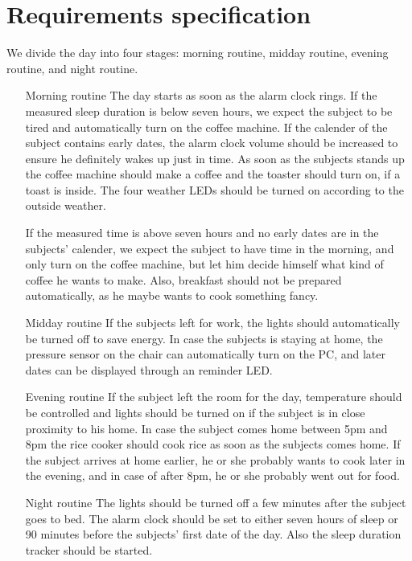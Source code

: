 \documentclass[runningheads]{llncs}
\begin{document}
\section{Requirements specification}
We divide the day into four stages: morning routine, midday routine, evening routine, and night routine.

\begin{itemize}
	\item[Morning routine] The day starts as soon as the alarm clock rings.
	If the measured sleep duration is below seven hours, we expect the subject to be tired and automatically turn on the coffee machine.
	If the calender of the subject contains early dates, the alarm clock volume should be increased to ensure he definitely wakes up just in time.
	As soon as the subjects stands up the coffee machine should make a coffee and the toaster should turn on, if a toast is inside.  
	The four weather LEDs should be turned on according to the outside weather. 
	
	If the measured time is above seven hours and no early dates are in the subjects' calender, we expect the subject to have time in the morning, and only turn on the coffee machine, but let him decide himself what kind of coffee he wants to make.
	Also, breakfast should not be prepared automatically, as he maybe wants to cook something fancy.
	
	\item[Midday routine] If the subjects left for work, the lights should automatically be turned off to save energy. 
	In case the subjects is staying at home, the pressure sensor on the chair can automatically turn on the PC, and later dates can be displayed through an reminder LED.
	
	\item[Evening routine] If the subject left the room for the day, temperature should be controlled and lights should be turned on if the subject is in close proximity to his home. 
	In case the subject comes home between 5pm and 8pm the rice cooker should cook rice as soon as the subjects comes home. 
	If the subject arrives at home earlier, he or she probably wants to cook later in the evening, and in case of after 8pm, he or she probably went out for food.
	
	\item[Night routine] The lights should be turned off a few minutes after the subject goes to bed. 
	The alarm clock should be set to either seven hours of sleep or 90 minutes before the subjects' first date of the day.
	Also the sleep duration tracker should be started. 
	
\end{itemize}

%
%
%
%

\end{document}
